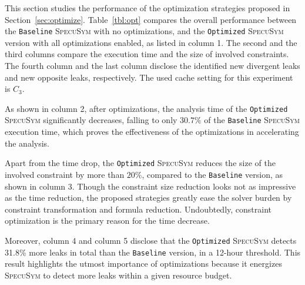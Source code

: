 \documentclass[sigconf]{acmart}
\newcommand{\SpecuSym}{\textsc{SpecuSym} }
\begin{document}
\begin{table}%
\caption{Overall performance Increases from Optimization. }
\label{tbl:opt}
\centering
{}
\vspace{-2ex}
\end{table}




This section studies the performance of the optimization strategies 
proposed in Section~\ref{sec:optimize}. Table~\ref{tbl:opt} compares 
the overall performance between the \texttt{Baseline} \SpecuSym with
no optimizations, and the \texttt{Optimized} \SpecuSym version with 
all optimizations enabled, as listed in column 1. The second and the 
third columns compare the execution time and the size of involved 
constraints. The fourth column and the last column disclose the 
identified new divergent leaks and new opposite leaks, respectively. 
The used cache setting for this experiment is $C_3$.


As shown in column 2, after optimizations, the analysis time of the 
\texttt{Optimized} \SpecuSym significantly decreases, falling to only 
$30.7\%$ of the \texttt{Baseline} \textsc{SpecuSym} execution time, 
which proves the effectiveness of the optimizations in accelerating 
the analysis. 


Apart from the time drop, the \texttt{Optimized} \SpecuSym reduces
the size of the involved constraint by more than $20\%$, compared 
to the \texttt{Baseline} version, as shown in column 3. Though the 
constraint size reduction looks not as impressive as the time reduction, 
the proposed strategies greatly ease the solver burden by constraint 
transformation and formula reduction. Undoubtedly, constraint optimization 
is the primary reason for the time decrease.


Moreover, column 4 and column 5 disclose that the \texttt{Optimized} 
\SpecuSym detects 31.8\% more leaks in total than the \texttt{Baseline} 
version, in a 12-hour threshold. This result highlights the utmost 
importance of optimizations because it energizes \SpecuSym to detect more 
leaks within a given resource budget. 
\end{document}
